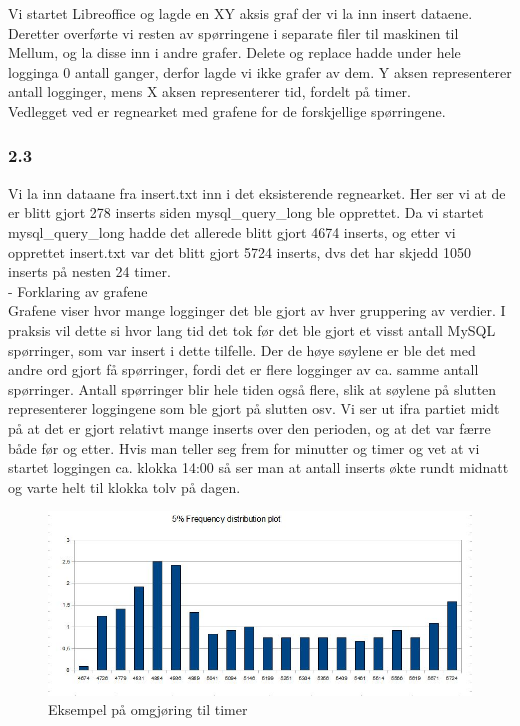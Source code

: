 \documentclass[a4paper, norsk, 12pt]{article}
\begin{document}
Vi startet Libreoffice og lagde en XY aksis graf der vi la inn insert dataene. Deretter overførte vi resten av spørringene i separate filer til maskinen til Mellum, og la disse inn i andre grafer. Delete og replace hadde under hele logginga 0 antall ganger, derfor lagde vi ikke grafer av dem. Y aksen representerer antall logginger, mens X aksen representerer tid, fordelt på timer. \\

Vedlegget ved er regnearket med grafene for de forskjellige spørringene.

\subsubsection*{2.3}
Vi la inn dataane fra insert.txt inn i det eksisterende regnearket. Her ser vi at de er blitt gjort 278 inserts siden mysql\_query\_long ble opprettet. Da vi startet mysql\_query\_long hadde det allerede blitt gjort 4674 inserts, og etter vi opprettet insert.txt var det blitt gjort 5724 inserts, dvs det har skjedd 1050 inserts på nesten 24 timer. \\

- Forklaring av grafene\\
Grafene viser hvor mange logginger det ble gjort av hver gruppering av verdier. I praksis vil dette si hvor lang tid det tok før det ble gjort et visst antall MySQL spørringer, som var insert i dette tilfelle. Der de høye søylene er ble det med andre ord gjort få spørringer, fordi det er flere logginger av ca. samme antall spørringer. Antall spørringer blir hele tiden også flere, slik at søylene på slutten representerer loggingene som ble gjort på slutten osv. Vi ser ut ifra partiet midt på at det er gjort relativt mange inserts over den perioden, og at det var færre både før og etter. Hvis man teller seg frem for minutter og timer og vet at vi startet loggingen ca. klokka 14:00 så ser man at antall inserts økte rundt midnatt og varte helt til klokka tolv på dagen.

\begin{figure}[h!]
 \centering
  \includegraphics[width=1.0\textwidth]{Images/TF_timer.jpg}
 \caption{Eksempel på omgjøring til timer}
\end{figure}
\end{document}
